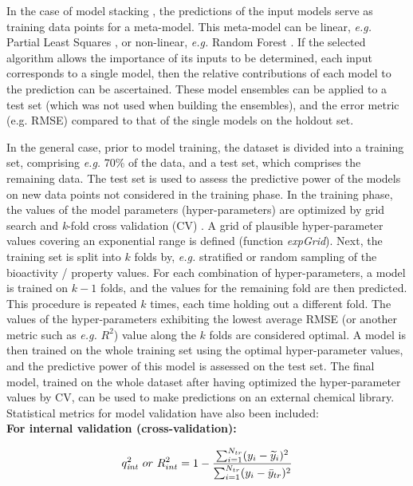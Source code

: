 \documentclass{bmcart}
\begin{document}
In the case of model stacking \cite{cortesCOX}, 
the predictions of the input models serve as training data points for a meta-model.
This meta-model can be linear, {\it e.g.} Partial Least Squares \cite{pls},
or non-linear, {\it e.g.} Random Forest \cite{rf}.
If the selected algorithm allows the
importance of its inputs to be determined, each input
corresponds to a single model, then the relative contributions of each 
model to the prediction can be ascertained. 
These model ensembles can be applied to a test set (which was not used when building the ensembles), and the error metric (e.g. RMSE) compared to that of the single models on the holdout set.

In the general case, prior to model training, the dataset is divided into a training set,
comprising {\it e.g.} 70\% of the data, and 
a test set, which comprises the remaining data.
The test set is used to assess the predictive power of the models on new data points
not considered in the training phase.
In the training phase, the values of the model parameters (hyper-parameters) are optimized by grid search and {\it k}-fold cross validation (CV) \cite{overfitting}.
A grid of plausible hyper-parameter values covering an exponential range is defined (function {\it expGrid}).
Next, the training set is split into $k$ folds by, {\it e.g.} stratified or random sampling of the bioactivity / property values.
For each combination of hyper-parameters, 
a model is trained on $k-1$ folds, and the values for the remaining fold are then predicted. 
This procedure is repeated $k$ times, each time holding out a different fold. 
The values of the hyper-parameters exhibiting the lowest average RMSE (or another metric such as {\it e.g.} $R^2$)
value along the $k$ folds are considered optimal. 
A model is then trained on the whole training set using the optimal hyper-parameter values,
and the predictive power of this model is assessed on the test set. 
The final model, trained on the whole dataset after having optimized the hyper-parameter values by CV,
can be used to make predictions on an external chemical library.\\

Statistical metrics for model validation have also been included:\\

{\bf For internal validation (cross-validation):}

\begin{equation}
q_{{\it int}}^{2} \ or \  R_{int}^{2}  = 1 - \frac {\sum_{i=1}^{N_{tr}} (y_{i} - \widetilde{y}_{i})^{2}} {\sum_{i=1}^{N_{tr}} (y_{i} - \bar{y}_{tr})^{2}}
\end{equation}
\end{document}
